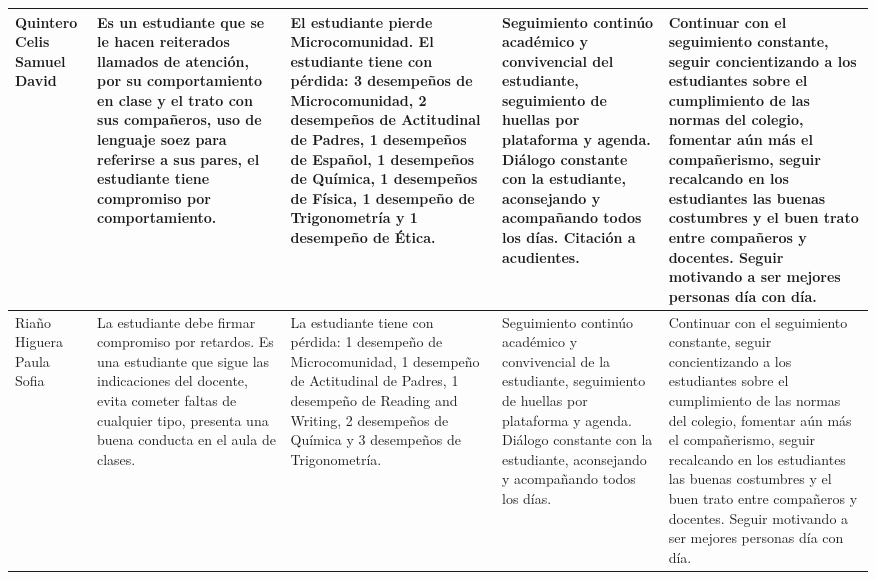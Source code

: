 \documentclass[spanish,11pt,a4paper]{article}
\begin{document}
\begin{longtable}{|p{3.5cm}|p{3.5cm}|p{3.5cm}|p{3.5cm}|p{3.5cm}|}
		Quintero Celis Samuel David & 
		Es un estudiante que se le hacen reiterados llamados de atención, por su comportamiento en clase y el trato con sus compañeros, uso de lenguaje soez para referirse a sus pares, el estudiante tiene compromiso por comportamiento.  & 
		El estudiante pierde Microcomunidad.
		El estudiante tiene con pérdida: 3 desempeños de Microcomunidad, 2 desempeños de Actitudinal de Padres, 1 desempeños de Español, 1 desempeños de Química, 1 desempeños de Física, 1 desempeño de Trigonometría y 1 desempeño de Ética. & 
		Seguimiento continúo académico y convivencial del estudiante, seguimiento de huellas por plataforma y agenda. Diálogo constante con la estudiante, aconsejando y acompañando todos los días. Citación a acudientes.& 
		Continuar con el seguimiento constante, seguir concientizando a los estudiantes sobre el cumplimiento de las normas del colegio, fomentar aún más el compañerismo, seguir recalcando en los estudiantes las buenas costumbres y el buen trato entre compañeros y docentes. Seguir motivando a ser mejores personas día con día.\\
		\hline
		
		Riaño Higuera Paula Sofia & 
		La estudiante debe firmar compromiso por retardos.
		Es una estudiante que sigue las indicaciones del docente, evita cometer faltas de cualquier tipo, presenta una buena conducta en el aula de clases. & 
		La estudiante tiene con pérdida: 1 desempeño de Microcomunidad, 1 desempeño de Actitudinal de Padres, 1 desempeño de Reading and Writing, 2 desempeños de Química y 3 desempeños de Trigonometría. & 
		Seguimiento continúo académico y convivencial de la estudiante, seguimiento de huellas por plataforma y agenda. Diálogo constante con la estudiante, aconsejando y acompañando todos los días. & 
		Continuar con el seguimiento constante, seguir concientizando a los estudiantes sobre el cumplimiento de las normas del colegio, fomentar aún más el compañerismo, seguir recalcando en los estudiantes las buenas costumbres y el buen trato entre compañeros y docentes. Seguir motivando a ser mejores personas día con día.\\
		\hline
		

\end{longtable}
\end{document}
